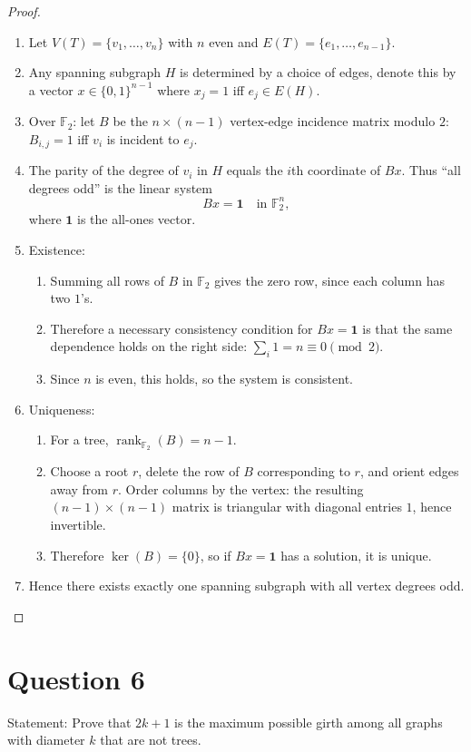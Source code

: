 \documentclass[11pt]{article}
\begin{document}
\begin{proof}
~
\begin{enumerate}
\item Let $V(T)=\{v_1,\dots,v_n\}$ with $n$ even and $E(T)=\{e_1,\dots,e_{n-1}\}$.
\item Any spanning subgraph $H$ is determined by a choice of edges, denote this by a vector
$x\in\{0,1\}^{n-1}$ where $x_j=1$ iff $e_j\in E(H)$.
\item Over $\mathbb{F}_2$: let $B$ be the $n\times(n-1)$ vertex-edge incidence matrix modulo $2$:
$B_{i,j}=1$ iff $v_i$ is incident to $e_j$.
\item The parity of the degree of $v_i$ in $H$ equals the $i$th coordinate of $Bx$.
Thus “all degrees odd” is the linear system
\[
Bx=\mathbf{1}
\quad\text{in }\mathbb{F}_2^n,
\]
where $\mathbf{1}$ is the all-ones vector.
\item Existence:
\begin{enumerate}
\item Summing all rows of $B$ in $\mathbb{F}_2$ gives the zero row, since each column has two $1$'s.
\item Therefore a necessary consistency condition for $Bx=\mathbf{1}$ is that the same dependence holds on the right side:
$\sum_i 1 = n \equiv 0 \pmod 2$.
\item Since $n$ is even, this holds, so the system is consistent.
\end{enumerate}
\item Uniqueness:
\begin{enumerate}
\item For a tree, $\operatorname{rank}_{\mathbb{F}_2}(B)=n-1$.
\item Choose a root $r$, delete the row of $B$ corresponding to $r$, and orient edges away from $r$.
Order columns by the vertex: the resulting $(n-1)\times(n-1)$ matrix is triangular with diagonal entries $1$, hence invertible.
\item Therefore $\ker(B)=\{0\}$, so if $Bx=\mathbf{1}$ has a solution, it is unique.
\end{enumerate}
\item Hence there exists exactly one spanning subgraph with all vertex degrees odd.
\end{enumerate}
\end{proof}

\newpage

\section*{Question 6}
Statement: Prove that $2k+1$ is the maximum possible girth among all graphs with diameter $k$ that are not trees.
\end{document}
